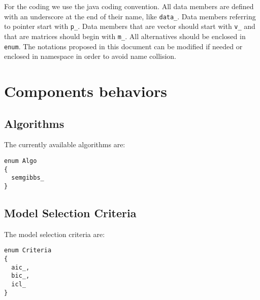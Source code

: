 \documentclass[a4paper,11pt]{article}
\begin{document}
For the coding we use the java coding convention. All data members
are defined with an underscore at the end of their name, like \verb+data_+.
Data members referring to pointer start with \verb+p_+.
Data members that are vector should start with \verb+v_+ and that are matrices should begin with \verb+m_+.
All alternatives should be enclosed in \verb+enum+.
The notations proposed in this document can be modified if needed
or enclosed in namespace in order to avoid name collision.


\section{Components behaviors}
\subsection{Algorithms}

The currently available algorithms are:
\begin{verbatim}
enum Algo
{
  semgibbs_
}
\end{verbatim}

\subsection{Model Selection Criteria}
The model selection criteria are:
\begin{verbatim}
enum Criteria
{
  aic_,
  bic_,
  icl_
}
\end{verbatim}
\end{document}
